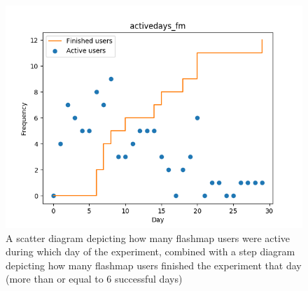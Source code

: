 \begin{figure}
    \centering
    \includegraphics[width=.7\textwidth]{img/activedays_fm.png}
    \caption{A scatter diagram depicting how many flashmap users were active during which day of the experiment, combined with a step diagram depicting how many flashmap users finished the experiment that day (more than or equal to 6 successful days)}
    \label{fig:activedays_fm}
\end{figure}
